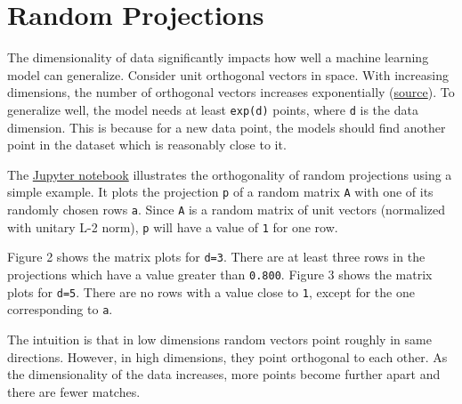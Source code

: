 \chapter{Random Projections}
The dimensionality of data significantly impacts how well a machine learning model can generalize.
Consider unit orthogonal vectors in space.
With increasing dimensions, the number of orthogonal vectors increases exponentially (\href{https://www.cs.princeton.edu/courses/archive/fall15/cos521/lecnotes/lec12.pdf}{source}).
To generalize well, the model needs at least \texttt{exp(d)} points, where \texttt{d} is the data dimension.
This is because for a new data point, the models should find another point in the dataset which is reasonably close to it. 

The \href{https://github.com/Atcold/pytorch-Deep-Learning-Minicourse/blob/master/extra/a-projections.ipynb}{Jupyter notebook} illustrates the orthogonality of random projections using a simple example.
It plots the projection \texttt{p} of a random matrix \texttt{A} with one of its randomly chosen rows \texttt{a}.
Since \texttt{A} is a random matrix of unit vectors (normalized with unitary L-2 norm), \texttt{p} will have a value of \texttt{1} for one row. 

Figure 2 shows the matrix plots for \texttt{d=3}.
There are at least three rows in the projections which have a value greater than \texttt{0.800}.
Figure 3 shows the matrix plots for \texttt{d=5}.
There are no rows with a value close to \texttt{1}, except for the one corresponding to \texttt{a}.

The intuition is that in low dimensions random vectors point roughly in same directions.
However, in high dimensions, they point orthogonal to each other.
As the dimensionality of the data increases, more points become further apart and there are fewer matches.

